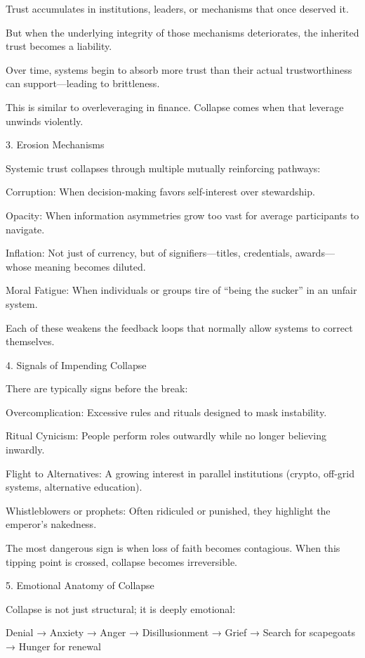 \documentclass[11pt,oneside]{book}
\begin{document}
    Trust accumulates in institutions, leaders, or mechanisms that once deserved it.

    But when the underlying integrity of those mechanisms deteriorates, the inherited trust becomes a liability.

    Over time, systems begin to absorb more trust than their actual trustworthiness can support—leading to brittleness.

This is similar to overleveraging in finance. Collapse comes when that leverage unwinds violently.

3. Erosion Mechanisms


Systemic trust collapses through multiple mutually reinforcing pathways:

    Corruption: When decision-making favors self-interest over stewardship.

    Opacity: When information asymmetries grow too vast for average participants to navigate.

    Inflation: Not just of currency, but of signifiers—titles, credentials, awards—whose meaning becomes diluted.

    Moral Fatigue: When individuals or groups tire of “being the sucker” in an unfair system.

Each of these weakens the feedback loops that normally allow systems to correct themselves.

4. Signals of Impending Collapse


There are typically signs before the break:

    Overcomplication: Excessive rules and rituals designed to mask instability.

    Ritual Cynicism: People perform roles outwardly while no longer believing inwardly.

    Flight to Alternatives: A growing interest in parallel institutions (crypto, off-grid systems, alternative education).

    Whistleblowers or prophets: Often ridiculed or punished, they highlight the emperor’s nakedness.

The most dangerous sign is when loss of faith becomes contagious. When this tipping point is crossed, collapse becomes irreversible.

5. Emotional Anatomy of Collapse


Collapse is not just structural; it is deeply emotional:

    Denial → Anxiety → Anger → Disillusionment → Grief → Search for scapegoats → Hunger for renewal
\end{document}

